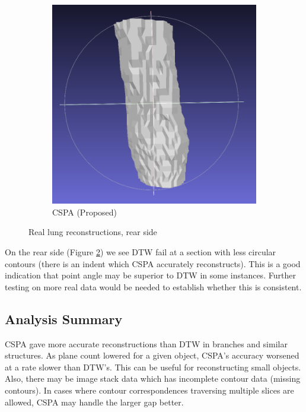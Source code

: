 \documentclass[11p, titlepage]{article}
\begin{document}
\begin{figure}[h!]
\begin{subfigure}[b]{0.45\textwidth}
         \includegraphics[width=\textwidth]{reconstructions/cspa50-real-back}
         \caption{CSPA (Proposed)}
         \label{fig:cspa50_real_back}
     \end{subfigure}
        \caption{Real lung reconstructions, rear side}
        \label{fig:real_reconstructions_back}
\end{figure}

On the rear side (Figure \ref{fig:real_reconstructions_back}) we see DTW fail at a section with less circular contours (there is an indent which CSPA accurately reconstructs). This is a good indication that point angle may be superior to DTW in some instances. Further testing on more real data would be needed to establish whether this is consistent.
\pagebreak

\subsection{Analysis Summary}

CSPA gave more accurate reconstructions than DTW in branches and similar structures. As plane count lowered for a given object, CSPA's accuracy worsened at a rate slower than DTW's. This can be useful for reconstructing small objects. Also, there may be image stack data which has incomplete contour data (missing contours). In cases where contour correspondences traversing multiple slices are allowed, CSPA may handle the larger gap better.
\end{document}
